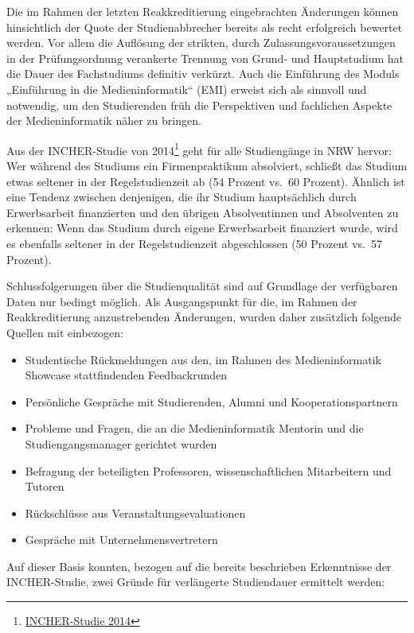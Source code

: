 Die im Rahmen der letzten Reakkreditierung eingebrachten Änderungen
können hinsichtlich der Quote der Studienabbrecher bereits als recht
erfolgreich bewertet werden. Vor allem die Auflösung der strikten, durch
Zulassungsvoraussetzungen in der Prüfungsordnung verankerte Trennung von
Grund- und Hauptstudium hat die Dauer des Fachstudiums definitiv
verkürzt. Auch die Einführung des Moduls „Einführung in die
Medieninformatik`` (EMI) erweist sich als sinnvoll und notwendig, um den
Studierenden früh die Perspektiven und fachlichen Aspekte der
Medieninformatik näher zu bringen.

Aus der INCHER-Studie von 2014\footnote{\href{../anhaenge/INCHER-Studie.pdf}{INCHER-Studie
  2014}} geht für alle Studiengänge in NRW hervor: Wer während des
Studiums ein Firmenpraktikum absolviert, schließt das Studium etwas
seltener in der Regelstudienzeit ab (54 Prozent vs.~60 Prozent). Ähnlich
ist eine Tendenz zwischen denjenigen, die ihr Studium hauptsächlich
durch Erwerbsarbeit finanzierten und den übrigen Absolventinnen und
Absolventen zu erkennen: Wenn das Studium durch eigene Erwerbsarbeit
finanziert wurde, wird es ebenfalls seltener in der Regelstudienzeit
abgeschlossen (50 Prozent vs.~57 Prozent).

Schlussfolgerungen über die Studienqualität sind auf Grundlage der
verfügbaren Daten nur bedingt möglich. Als Ausgangspunkt für die, im
Rahmen der Reakkreditierung anzustrebenden Änderungen, wurden daher
zusätzlich folgende Quellen mit einbezogen:

\begin{itemize}
\tightlist
\item
  Studentische Rückmeldungen aus den, im Rahmen des Medieninformatik
  Showcase stattfindenden Feedbackrunden
\item
  Persönliche Gespräche mit Studierenden, Alumni und
  Kooperationspartnern
\item
  Probleme und Fragen, die an die Medieninformatik Mentorin und die
  Studiengangsmanager gerichtet wurden
\item
  Befragung der beteiligten Professoren, wissenschaftlichen Mitarbeitern
  und Tutoren
\item
  Rückschlüsse aus Veranstaltungsevaluationen
\item
  Gespräche mit Unternehmensvertretern
\end{itemize}

Auf dieser Basis konnten, bezogen auf die bereits beschrieben
Erkenntnisse der INCHER-Studie, zwei Gründe für verlängerte Studiendauer
ermittelt werden:

